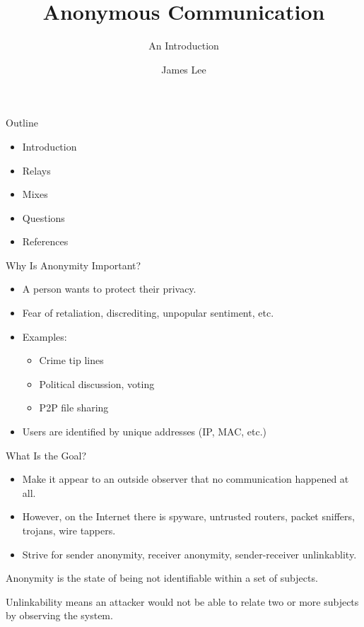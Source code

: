 \documentclass[default,pdf,colorBG,slideColor]{prosper}
\title{Anonymous Communication}
\subtitle{An Introduction}
\author{James Lee}
\begin{document}
\maketitle

\begin{slide}{Outline}
\begin{itemize}
\item Introduction
\item Relays
\item Mixes
\item Questions
\item References
\end{itemize}
\end{slide}

\begin{slide}{Why Is Anonymity Important?}
\begin{itemize}
\item A person wants to protect their privacy.
\item Fear of retaliation, discrediting, unpopular sentiment, etc.
\item Examples:
\begin{itemize}
	\item Crime tip lines
	\item Political discussion, voting
	\item P2P file sharing
\end{itemize}
\item Users are identified by unique addresses (IP, MAC, etc.)
\end{itemize}
\end{slide}

\begin{slide}{What Is the Goal?}
\begin{itemize}
\item Make it appear to an outside observer that no communication happened at all.
\item However, on the Internet there is spyware, untrusted routers, packet sniffers, trojans, wire tappers.
\item Strive for sender anonymity, receiver anonymity, sender-receiver unlinkablity.
\end{itemize}

\begin{description}
\item{Anonymity} is the state of being not identifiable within a set of subjects.
\item{Unlinkability} means an attacker would not be able to relate two or more subjects by observing the system.
\end{description}
\end{slide}
\end{document}
